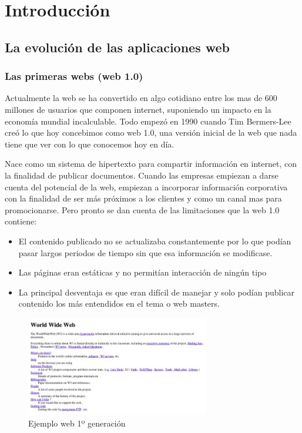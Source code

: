 \chapter{Introducción}
\section{La evolución de las aplicaciones web }
\subsection{Las primeras webs (web 1.0)}
Actualmente la web se ha convertido en algo cotidiano entre los mas de 600 millones de usuarios que componen internet, suponiendo un impacto en la economía mundial incalculable. Todo empezó en 1990 cuando Tim Bermers-Lee creó lo que hoy concebimos como web 1.0, una versión inicial de la web que nada tiene que ver con lo que conocemos hoy en día. 

Nace como un sistema de hipertexto para compartir información en internet, con la finalidad de publicar documentos. Cuando las empresas empiezan a darse cuenta del potencial de la web, empiezan a incorporar información corporativa con la finalidad de ser más próximos a los clientes y como un canal mas para promocionarse. Pero pronto se dan cuenta de las limitaciones que la web 1.0 contiene:

\begin{itemize}

    \item El contenido publicado no se actualizaba constantemente por lo que podían pasar largos periodos de tiempo sin que esa información se modificase.

    \item Las páginas eran estáticas y no permitían interacción de ningún tipo

    \item La principal desventaja es que eran difícil de manejar y solo podían publicar contenido los más entendidos en el tema o web masters.
 
\end{itemize}


\begin{figure}[H]
    \centering
    \includegraphics[width=80mm]{memoria/LaTeX/img/introduccion/web1.jpg}
    \caption[Ejemplo web 1º generación]{Ejemplo web 1º generación}
\end{figure}

